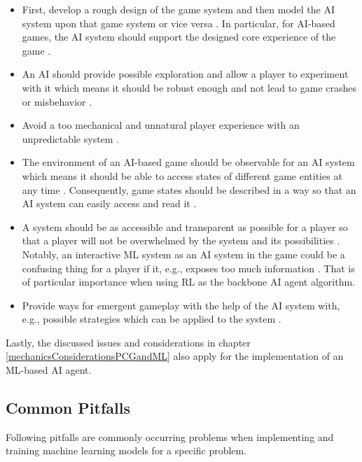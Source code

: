 \documentclass[MGS,Master,english]{twbook}%
\begin{document}
\begin{itemize}
	\item First, develop a rough design of the game system and then model the AI system upon that game system or vice versa \cite{ai::gameDesign}. In particular, for AI-based games, the AI system should support the designed core experience of the game \cite{ai::gameDesign}.
	\item An AI should provide possible exploration and allow a player to experiment with it which means it should be robust enough and not lead to game crashes or misbehavior \cite{ai::gameDesign}. 
	\item Avoid a too mechanical and unnatural player experience with an unpredictable system \cite{ai::gameDesign}.
	\item The environment of an AI-based game should be observable for an AI system which means it should be able to access states of different game entities at any time \cite{ai::gameDesign}. Consequently, game states should be described in a way so that an AI system can easily access and read it \cite{ai::book}.
	\item A system should be as accessible and transparent as possible for a player so that a player will not be overwhelmed by the system and its possibilities \cite{ai::gameDesign}. Notably, an interactive ML system as an AI system in the game could be a confusing thing for a player if it, e.g., exposes too much information \cite{ai::gameDesign}. That is of particular importance when using \ac{RL} as the backbone AI agent algorithm.
	\item Provide ways for emergent gameplay with the help of the AI system with, e.g., possible strategies which can be applied to the system \cite{ai::gameDesign}. 
\end{itemize}
Lastly, the discussed issues and considerations in chapter \ref{mechanicsConsiderationsPCGandML} also apply for the implementation of an ML-based AI agent.

\subsection{Common Pitfalls}
Following pitfalls are commonly occurring problems when implementing and training machine learning models for a specific problem.
\end{document}

